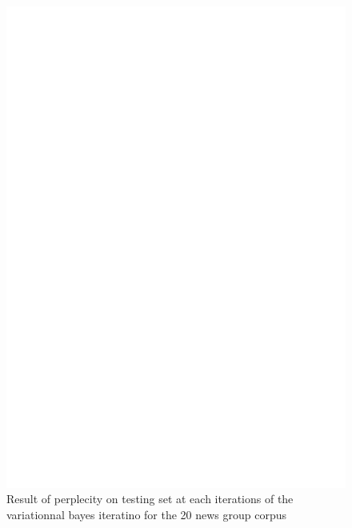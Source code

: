 \begin{figure}[h]
\label{fig:pp_conv}
\includegraphics[scale=0.4]{results/pp_conv.eps}
\caption{Result of perplecity on testing set at each iterations of the variationnal bayes iteratino for the 20 news group corpus}
\end{figure}


